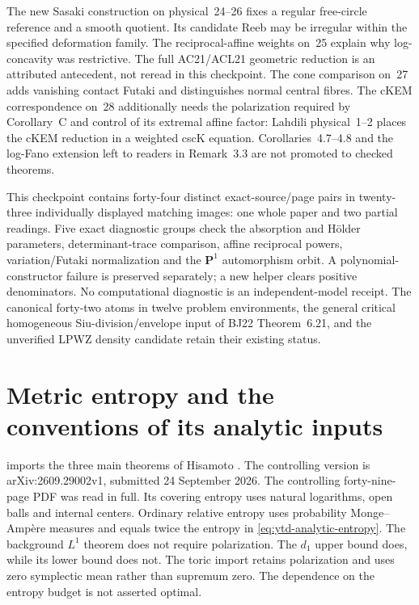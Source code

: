 The new Sasaki construction on physical~24--26 fixes a regular
free-circle reference and a smooth quotient. Its candidate Reeb
may be irregular within the specified deformation family.
The reciprocal-affine weights on~25 explain why log-concavity
was restrictive. The full AC21/ACL21 geometric reduction is an
attributed antecedent, not reread in this checkpoint. The cone
comparison on~27 adds vanishing contact Futaki and distinguishes
normal central fibres. The cKEM correspondence on~28 additionally
needs the polarization required by Corollary~C and control of its
extremal affine factor: Lahdili physical~1--2 places the cKEM
reduction in a weighted cscK equation. Corollaries~4.7--4.8 and
the log-Fano extension left to readers in Remark~3.3 are not
promoted to checked theorems.

This checkpoint contains forty-four distinct exact-source/page pairs
in twenty-three individually displayed matching images: one whole
paper and two partial readings. Five exact diagnostic groups check
the absorption and H\"older parameters, determinant-trace comparison,
affine reciprocal powers, variation/Futaki normalization and the
$\mathbf P^1$ automorphism orbit. A polynomial-constructor failure
is preserved separately; a new helper clears positive denominators.
No computational diagnostic is an independent-model receipt.
The canonical forty-two atoms in twelve problem environments,
the general critical homogeneous Siu-division/envelope input of
BJ22 Theorem~6.21, and the unverified LPWZ density candidate
retain their existing status.

\section{Metric entropy and the conventions of its analytic inputs}
\label{sec:appL-metric-entropy-sources}

 imports the three main theorems of
Hisamoto \cite{Hisamoto26MetricEntropyV1}. The controlling version is
arXiv:\allowbreak2609.29002v1, submitted 24 September 2026. The controlling forty-nine-page PDF
was read in full. Its covering entropy uses natural logarithms,
open balls and internal centers. Ordinary relative entropy uses
probability Monge--Amp\`ere measures and equals twice the entropy
in \eqref{eq:ytd-analytic-entropy}. The background $L^1$ theorem
does not require polarization. The $d_1$ upper bound does, while its
lower bound does not. The toric import retains polarization and
uses zero symplectic mean rather than supremum zero. The dependence
on the entropy budget is not asserted optimal.

